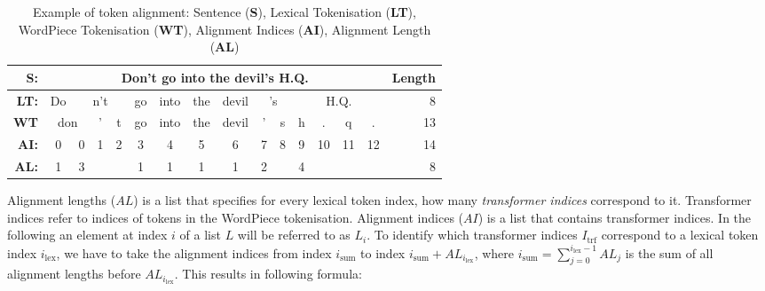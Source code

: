 \documentclass[11pt]{scrreprt}
\begin{document}
{%


\begin{table}[htp]
\centering
\begin{tabular}{rcccccccccccccc|r}
\textbf{S:} & \multicolumn{14}{c|}{Don't go into the devil's H.Q.} & \textbf{Length}\\
\midrule
\textbf{LT:} & Do & \multicolumn{3}{c}{n't} & go & into & the & devil &  \multicolumn{2}{c}{'s} & \multicolumn{4}{c|}{H.Q.} & 8\\
\textbf{WT} & \multicolumn{2}{c}{don} & ' & t & go & into & the & devil & '  & s & h & . & q & .  & 13\\
\midrule
\textbf{AI:} & 0 & 0 & 1 & 2 & 3 & 4 & 5 & 6 & 7 & 8 & 9 & 10 & 11 & 12 & 14 \\
\textbf{AL:} & 1 & 3 &   &   & 1 & 1 & 1 & 1 & 2 &   &  4  &   &    &  & 8 \\
\end{tabular}
\caption{Example of token alignment: Sentence (\textbf{S}), Lexical Tokenisation (\textbf{LT}), WordPiece Tokenisation (\textbf{WT}), Alignment Indices (\textbf{AI}), Alignment Length (\textbf{AL})}
\label{tab:token-alignment}
\end{table}


Alignment lengths (\(AL\)) is a list that specifies for every lexical token index, how many \textit{transformer indices} correspond to it. Transformer indices refer to indices of tokens in the WordPiece tokenisation. Alignment indices (\(AI\)) is a list that contains transformer indices. In the following an element at index \(i\) of a list \(L\) will be referred to as \(L_i\). To identify which transformer indices \(I_\text{trf}\) correspond to a lexical token index \(i_{\text{lex}}\), we have to take the alignment indices from index \(i_{\text{sum}}\) to index \(i_{\text{sum}} + AL_{i_{\text{lex}}}\), where \(i_{\text{sum}} = \sum_{j = 0}^{i_{\text{lex}} - 1} AL_j\) is the sum of all alignment lengths before \(AL_{i_\text{lex}}\). This results in following formula: 

}
\end{document}
